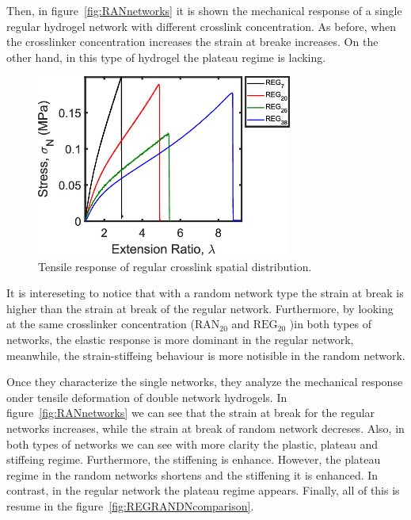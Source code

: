 Then, in figure~\ref{fig:RANnetworks} it is shown the mechanical response of a single regular hydrogel network with different crosslink concentration.
As before, when the crosslinker concentration increases the strain at breake increases.
On the other hand, in this type of hydrogel the plateau regime is lacking.

\begin{figure}[ht!]
    \centering
    \includegraphics[width=0.75\textwidth]{figs/explainMechResponse/singleREGtensile.jpeg}
    \caption{Tensile response of regular crosslink spatial distribution\citep{kongEffectCrossLinkHomogeneity2024}.}\label{fig:REGnetworks}
\end{figure}

It is intereseting to notice that with a random network type the strain at break is higher than the strain at break of the regular network.
Furthermore, by looking at the same crosslinker concentration ($\mathrm{RAN}_{20}$ and $\mathrm{REG}_{20}$ )in both types of networks, the elastic response is more dominant in the regular network, meanwhile, the strain-stiffeing behaviour is more notisible in the random network. 

Once they characterize the single networks, they analyze the mechanical response onder tensile deformation of double network hydrogels.
In figure~\ref{fig:RANnetworks} we can see that the strain at break for the regular networks increases, while the strain at break of random network decreses. 
Also, in both types of networks we can see with more clarity the plastic, plateau and stiffeing regime.
Furthermore, the stiffening is enhance.
However, the plateau regime in the random networks shortens and the stiffening it is enhanced.
In contrast, in the regular network the plateau regime appears.
Finally, all of this is resume in the figure~\ref{fig:REGRANDNcomparison}. 

